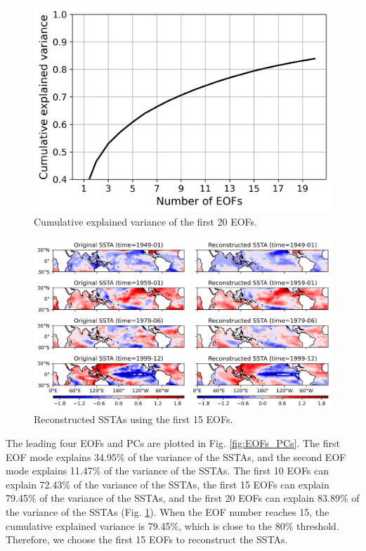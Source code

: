 \documentclass[12pt,a4paper]{article}
\begin{document}
\begin{figure}
\centering
\includegraphics[width=\textwidth]{figures/cumulative_explained_variance.png}
\caption{Cumulative explained variance of the first 20 EOFs.}
\label{fig:cumulative_explained_variance}
\end{figure}

\begin{figure}
\centering
\includegraphics[width=\textwidth]{figures/reconstruct_ssta.png}
\caption{Reconstructed SSTAs using the first 15 EOFs.}
\label{fig:reconstruct_ssta}
\end{figure}

The leading four EOFs and PCs are plotted in Fig. \ref{fig:EOFs_PCs}. The first EOF mode explains 34.95\% of the variance of the SSTAs, and the second EOF mode explains 11.47\% of the variance of the SSTAs. The first 10 EOFs can explain 72.43\% of the variance of the SSTAs, the first 15 EOFs can explain 79.45\% of the variance of the SSTAs, and the first 20 EOFs can explain 83.89\% of the variance of the SSTAs (Fig. \ref{fig:cumulative_explained_variance}). When the EOF number reaches 15, the cumulative explained variance is 79.45\%, which is close to the 80\% threshold. Therefore, we choose the first 15 EOFs to reconstruct the SSTAs.
\end{document}
